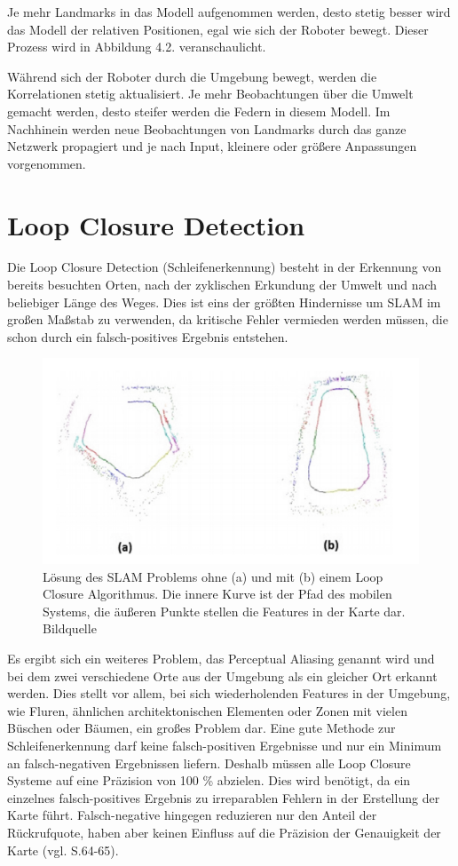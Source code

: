 Je mehr Landmarks in das Modell aufgenommen werden, desto stetig besser wird das Modell der relativen Positionen, egal wie sich der Roboter bewegt. Dieser Prozess wird in Abbildung 4.2. veranschaulicht.

Während sich der Roboter durch die Umgebung bewegt, werden die Korrelationen stetig aktualisiert. Je mehr Beobachtungen über die Umwelt gemacht werden, desto steifer werden die Federn in diesem Modell. Im Nachhinein werden neue Beobachtungen von Landmarks durch das ganze Netzwerk propagiert und je nach Input, kleinere oder größere Anpassungen vorgenommen.

\section{Loop Closure Detection}

Die \glqq Loop Closure Detection\grqq{} (Schleifenerkennung) besteht in der Erkennung von bereits besuchten Orten, nach der zyklischen Erkundung der Umwelt und nach beliebiger Länge des Weges. Dies ist eins der größten Hindernisse um SLAM im großen Maßstab zu verwenden, da kritische Fehler vermieden werden müssen, die schon durch ein falsch-positives Ergebnis entstehen.

\begin{figure}[H]
	\centering
	\includegraphics[scale=0.53]{loop.png}
	\caption{ Lösung des SLAM Problems ohne (a) und mit (b) einem Loop Closure Algorithmus. Die innere Kurve ist der Pfad des mobilen Systems, die äußeren Punkte stellen die Features in der Karte dar. Bildquelle \cite{loop_closure}}
\end{figure}  

Es ergibt sich ein weiteres Problem, das \glqq Perceptual Aliasing\grqq{} genannt wird und bei dem zwei verschiedene Orte aus der Umgebung als ein gleicher Ort erkannt werden. Dies stellt vor allem, bei sich wiederholenden Features in der Umgebung, wie Fluren, ähnlichen architektonischen Elementen oder Zonen mit vielen Büschen oder Bäumen, ein großes Problem dar. Eine gute Methode zur Schleifenerkennung darf keine falsch-positiven Ergebnisse und nur ein Minimum an falsch-negativen Ergebnissen liefern. Deshalb müssen alle Loop Closure Systeme auf eine Präzision von 100 \% abzielen. Dies wird benötigt, da ein einzelnes falsch-positives Ergebnis zu irreparablen Fehlern in der Erstellung der Karte führt. Falsch-negative hingegen reduzieren nur den Anteil der Rückrufquote, haben aber keinen Einfluss auf die Präzision der Genauigkeit der Karte (vgl. \cite{survey} S.64-65).



